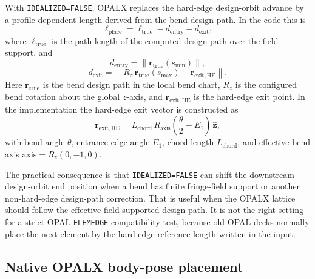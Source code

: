 \documentclass[11pt,a4paper]{article}
\begin{document}
With \texttt{IDEALIZED=FALSE}, OPALX replaces the hard-edge design-orbit
advance by a profile-dependent length derived from the bend design path.  In
the code this is
\[
  \ell_{\mathrm{place}}
    =
    \ell_{\mathrm{true}}
    - d_{\mathrm{entry}}
    - d_{\mathrm{exit}},
\]
where \(\ell_{\mathrm{true}}\) is the path length of the computed design path
over the field support, and
\[
  d_{\mathrm{entry}} = \|\mathbf r_{\mathrm{true}}(s_{\min})\|,
\]
\[
  d_{\mathrm{exit}}
    =
    \left\|
      R_z\,\mathbf r_{\mathrm{true}}(s_{\max})
      -
      \mathbf r_{\mathrm{exit,HE}}
    \right\|.
\]
Here \(\mathbf r_{\mathrm{true}}\) is the bend design path in the local bend
chart, \(R_z\) is the configured bend rotation about the global \(z\)-axis,
and \(\mathbf r_{\mathrm{exit,HE}}\) is the hard-edge exit point.  In the
implementation the hard-edge exit vector is constructed as
\[
  \mathbf r_{\mathrm{exit,HE}}
    =
    L_{\mathrm{chord}}\,
    R_{\mathrm{axis}}\!\left(\frac{\theta}{2}-E_1\right)\,
    \hat{\mathbf z},
\]
with bend angle \(\theta\), entrance edge angle \(E_1\), chord length
\(L_{\mathrm{chord}}\), and effective bend axis
\(\mathrm{axis}=R_z(0,-1,0)\).

The practical consequence is that \texttt{IDEALIZED=FALSE} can shift the
downstream design-orbit end position when a bend has finite fringe-field
support or another non-hard-edge design-path correction.  That is useful when
the OPALX lattice should follow the effective field-supported design path.  It
is not the right setting for a strict OPAL \texttt{ELEMEDGE} compatibility
test, because old OPAL decks normally place the next element by the hard-edge
reference length written in the input.

\subsection{Native OPALX body-pose placement}
\end{document}
